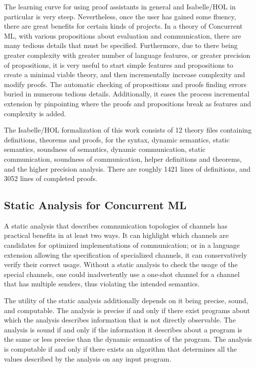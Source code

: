 \documentclass[letterpaper, 11pt]{extarticle}
\begin{document}
The learning curve for using proof assistants in general and Isabelle/HOL in particular is very steep.
Nevertheless, once the user has gained some fluency, there are great benefits for certain kinds of projects.  
In a theory of Concurrent ML, with various propositions about evaluation and communication, there are many
tedious details that must be specified. Furthermore, due to there being greater complexity with greater
number of language features, or greater precision of propositions, it is very useful to start simple features
and propositions to create a minimal viable theory, and then incrementally increase complexity and modify proofs.
The automatic checking of propositions and proofs finding errors buried in numerous tedious details.
Additionally, it eases the process incremental extension by pinpointing where the proofs and propositions break
as features and complexity is added.

The Isabelle/HOL formalization of this work consists of 12 theory files containing definitions, theorems
and proofs, for the syntax, dynamic semantics, static semantics, soundness of semantics, dynamic communication,
static communication, soundness of communication, helper definitions and theorems, and the
higher precision analysis.  There are roughly 1421 lines of definitions, and 3052 lines of completed proofs. 

\subsection{Static Analysis for Concurrent ML}
A static analysis that describes communication
topologies of channels has practical benefits in at least two ways.  It can highlight which
channels are candidates for optimized implementations of communication; or in a language
extension allowing the specification of specialized channels, it can conservatively verify
their correct usage. Without a static analysis to check the usage of the special channels, one
could inadvertently use a one-shot channel for a channel that has multiple senders, thus
violating the intended semantics. 

The utility of the static analysis additionally depends on it being precise, sound, and
computable. The analysis is precise if and only if there exist programs about which the analysis
describes information that is not directly observable. The analysis is sound if and only if the
information it describes about a program is the same or less precise than the dynamic
semantics of the program. The analysis is computable if and only if there exists an algorithm that
determines all the values described by the analysis on any input program.
\end{document}
